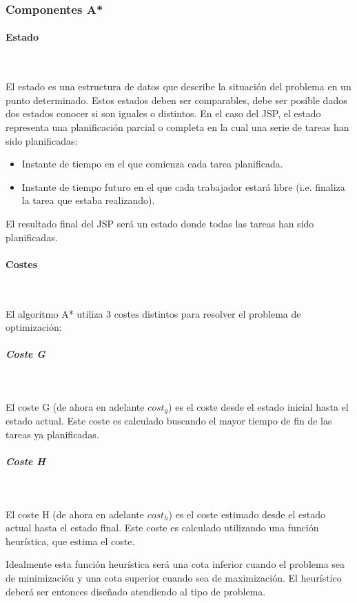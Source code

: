 \pagebreak

\subsubsection{Componentes A*}

\paragraph{Estado}~

El estado es una estructura de datos que describe la situación
del problema en un punto determinado.
Estos estados deben ser comparables,
debe ser posible dados dos estados conocer si son iguales o distintos.
En el caso del JSP, el estado representa una planificación parcial o completa
en la cual una serie de tareas han sido planificadas:

\begin{itemize}[itemsep=0.25px]
    \item Instante de tiempo en el que comienza cada tarea planificada.
    \item Instante de tiempo futuro en el que cada trabajador estará libre
    (i.e. finaliza la tarea que estaba realizando).
\end{itemize}

El resultado final del JSP será un estado donde todas las tareas han sido planificadas.

\paragraph{Costes}~

El algoritmo A* utiliza 3 costes distintos para resolver el problema de optimización:

\subparagraph{Coste G}~

El coste G (de ahora en adelante $cost_g$) es el coste desde el estado inicial
hasta el estado actual.
Este coste es calculado buscando el mayor tiempo de fin de
las tareas ya planificadas.

\subparagraph{Coste H}~

El coste H (de ahora en adelante $cost_h$) es el coste estimado desde el estado actual
hasta el estado final.
Este coste es calculado utilizando una función heurística,
que estima el coste.

Idealmente esta función heurística será una cota inferior cuando el problema
sea de minimización y una cota superior cuando sea de maximización.
El heurístico deberá ser entonces diseñado atendiendo al tipo de problema.

